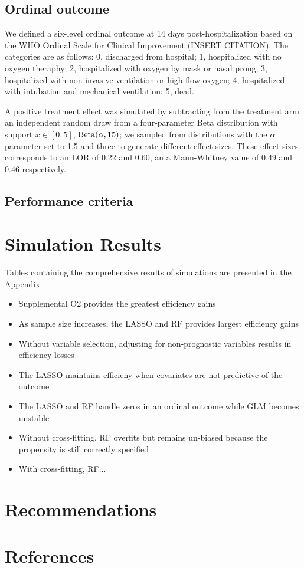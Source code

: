 \documentclass{article}
\begin{document}
\subsection{Ordinal outcome}

We defined a six-level ordinal outcome at 14 days post-hospitalization based on the WHO Ordinal Scale for Clinical Improvement (INSERT CITATION). The categories are as follows: 0, discharged from hospital; 1, hospitalized with no oxygen theraphy; 2, hospitalized with oxygen by mask or nasal prong; 3, hospitalized with non-invasive ventilation or high-flow oxygen; 4, hospitalized with intubation and mechanical ventilation; 5, dead.

A positive treatment effect was simulated by subtracting from the treatment arm an independent random draw from a four-parameter Beta distribution with support $x \in [0, 5]$, $\textnormal{Beta}(\alpha, 15)$; we sampled from distributions with the $\alpha$ parameter set to 1.5 and three to generate different effect sizes. These effect sizes corresponds to an LOR of 0.22 and 0.60, an a Mann-Whitney value of 0.49 and 0.46 respectively. 

\subsection{Performance criteria}

\section{Simulation Results}

Tables containing the comprehensive results of simulations are presented in the Appendix.

\begin{itemize}
  \item Supplemental O2 provides the greatest efficiency gains
  \item As sample size increases, the LASSO and RF provides largest efficiency gains
  \item Without variable selection, adjusting for non-prognostic variables results in efficiency losses
  \item The LASSO maintains efficieny when covariates are not predictive of the outcome
  \item The LASSO and RF handle zeros in an ordinal outcome while GLM becomes unstable
  \item Without cross-fitting, RF overfits but remains un-biased because the propensity is still correctly specified 
  \item With cross-fitting, RF...
\end{itemize}

\section{Recommendations}

\section{References}



\appendix
\end{document}
